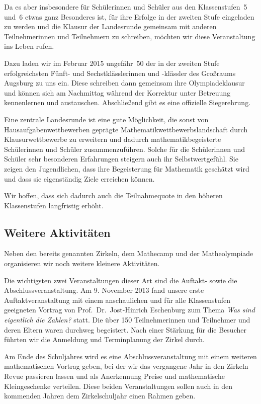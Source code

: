 \documentclass[12pt]{zettel}
\begin{document}
Da es aber insbesondere für Schülerinnen und Schüler aus den Klassenstufen~5
und~6 etwas ganz Besonderes ist, für ihre Erfolge in der zweiten Stufe
eingeladen zu werden und die Klausur der Landesrunde gemeinsam mit anderen
Teilnehmerinnen und Teilnehmern zu schreiben, möchten wir diese Veranstaltung
ins Leben rufen.

Dazu laden wir im Februar 2015 ungefähr~50 der in der zweiten Stufe
erfolgreichsten Fünft- und Sechstklässlerinnen und -klässler des Großraums
Augsburg zu uns ein. Diese schreiben dann gemeinsam ihre Olympiadeklausur und
können sich am Nachmittag während der Korrektur unter Betreuung kennenlernen
und austauschen. Abschließend gibt es eine offizielle Siegerehrung.

Eine zentrale Landesrunde ist eine gute Möglichkeit, die sonst von
Hausaufgabenwettbewerben geprägte Mathematikwettbewerbslandschaft durch
Klausurwettbewerbe zu erweitern und dadurch mathematikbegeisterte Schülerinnen
und Schüler zusammenzuführen. Solche für die Schülerinnen und Schüler
sehr besonderen Erfahrungen steigern auch ihr Selbstwertgefühl. Sie zeigen
den Jugendlichen, dass ihre Begeisterung für Mathematik geschätzt wird und dass sie eigenständig Ziele erreichen können.

Wir hoffen, dass sich dadurch auch die Teilnahmequote  %
in den höheren Klassenstufen langfristig erhöht.


\subsection{Weitere Aktivitäten}

Neben den bereits genannten Zirkeln, dem Mathecamp und der
Matheolympiade organisieren wir noch weitere kleinere
Aktivitäten.

Die wichtigsten zwei Veranstaltungen dieser Art sind die Auftakt- sowie die
Abschlussveranstaltung. Am 9. November 2013 fand unsere erste
Auftaktveranstaltung mit einem anschaulichen und für alle Klassenstufen
geeigneten Vortrag von
Prof.~Dr.~Jost-Hinrich Eschenburg zum Thema \emph{Was sind eigentlich die
Zahlen?} statt.
Die über 150 Teilnehmerinnen und Teilnehmer und deren Eltern waren durchweg
begeistert. Nach einer Stärkung für die Besucher führten wir
die Anmeldung und Terminplanung der Zirkel durch.

Am Ende des Schuljahres wird es eine Abschlussveranstaltung mit einem
weiteren mathematischen Vortrag geben, bei der wir
das vergangene Jahr in den Zirkeln Revue passieren lassen und als Anerkennung
Preise und mathematische Kleingeschenke verteilen. Diese beiden Veranstaltungen sollen
auch in den kommenden Jahren dem Zirkelschuljahr einen Rahmen geben.
\end{document}
